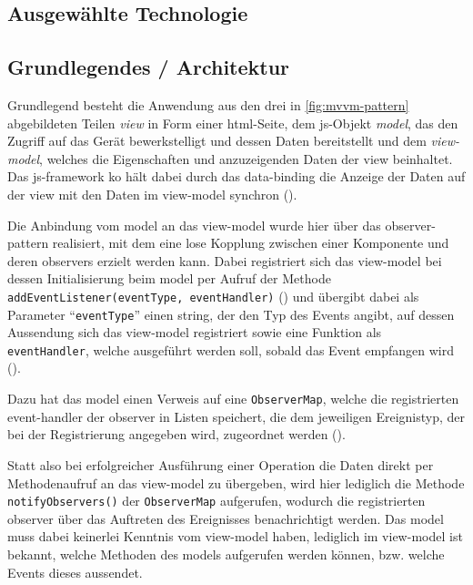 \subsection{Ausgewählte Technologie} 

\subsection{Grundlegendes / Architektur}
	
Grundlegend besteht die Anwendung aus den drei in \autoref{fig:mvvm-pattern} abgebildeten Teilen \emph{\gls{view}} in Form einer \gls{html}-Seite, dem \gls{js}-Objekt \emph{\gls{model}}, das den Zugriff auf das Gerät bewerkstelligt und dessen Daten bereitstellt und dem \emph{\gls{view-model}}, welches die Eigenschaften und anzuzeigenden Daten der \gls{view} beinhaltet.
Das \gls{js}-\gls{framework} \gls{ko} hält dabei durch das \gls{data-binding} die Anzeige der Daten auf der \gls{view} mit den Daten im \gls{view-model} synchron ().

Die Anbindung vom \gls{model} an das \gls{view-model} wurde hier über das \gls{observer-pattern} realisiert, mit dem eine lose Kopplung zwischen einer Komponente und deren \glspl{observer} erzielt werden kann.
Dabei registriert sich das \gls{view-model} bei dessen Initialisierung beim \gls{model} per Aufruf der Methode \lstinline|addEventListener(eventType, eventHandler)| () und übergibt dabei als Parameter \enquote{\lstinline|eventType|} einen \gls{string}, der den Typ des Events angibt, auf dessen Aussendung sich das \gls{view-model} registriert sowie eine Funktion als \lstinline|eventHandler|, welche ausgeführt werden soll, sobald das Event empfangen wird ().

Dazu hat das \gls{model} einen Verweis auf eine \lstinline|ObserverMap|, welche die registrierten \gls{event-handler} der \gls{observer} in Listen speichert, die dem jeweiligen Ereignistyp, der bei der Registrierung angegeben wird, zugeordnet werden ().

Statt also bei erfolgreicher Ausführung einer Operation die Daten direkt per Methodenaufruf an das \gls{view-model} zu übergeben, wird hier lediglich die Methode \lstinline|notifyObservers()| der \lstinline|ObserverMap| aufgerufen, wodurch die registrierten \gls{observer} über das Auftreten des Ereignisses benachrichtigt werden.
Das \gls{model} muss dabei keinerlei Kenntnis vom \gls{view-model} haben, lediglich im \gls{view-model} ist bekannt, welche Methoden des \glspl{model} aufgerufen werden können, bzw. welche Events dieses aussendet.

